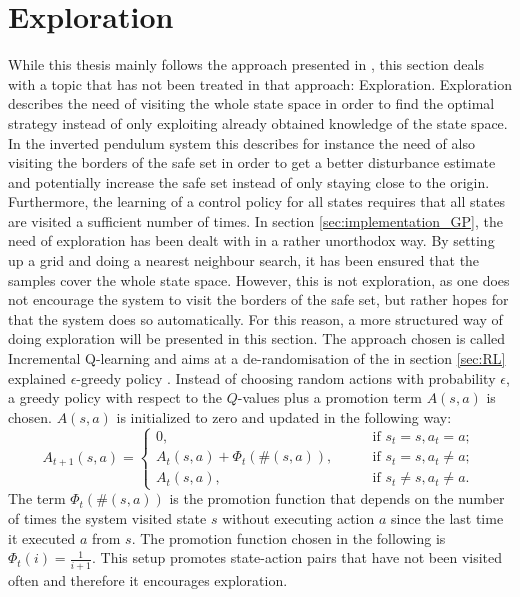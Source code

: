 \documentclass[../main.tex]{subfiles}
\begin{document}
\section{Exploration} \label{sec:Exploration}
While this thesis mainly follows the approach presented in \cite{akametalu2014reachability}, this section deals with a topic that has not been treated in that approach: Exploration. Exploration describes the need of visiting the whole state space in order to find the optimal strategy instead of only exploiting already obtained knowledge of the state space. In the inverted pendulum system this describes for instance the need of also visiting the borders of the safe set in order to get a better disturbance estimate and potentially increase the safe set instead of only staying close to the origin. Furthermore, the learning of a control policy for all states requires that all states are visited a sufficient number of times. In section \ref{sec:implementation_GP}, the need of exploration has been dealt with in a rather unorthodox way. By setting up a grid and doing a nearest neighbour search, it has been ensured that the samples cover the whole state space. However, this is not exploration, as one does not encourage the system to visit the borders of the safe set, but rather hopes for that the system does so automatically. For this reason, a more structured way of doing exploration will be presented in this section. The approach chosen is called Incremental Q-learning and aims at a de-randomisation of the in section \ref{sec:RL} explained $\epsilon$-greedy policy \cite{even2001convergence}. Instead of choosing random actions with probability $\epsilon$, a greedy policy with respect to the $Q$-values plus a promotion term $A(s,a)$ is chosen. $A(s,a)$ is initialized to zero and updated in the following way:
\begin{equation}
    A_{t+1}(s,a) = 
\begin{cases}
    0,\qquad &\text{if } s_t = s, a_t = a;\\    
    A_{t}(s,a) + \Phi_t(\#(s,a)),\qquad &\text{if } s_t = s, a_t \neq a;\\
    A_{t}(s,a),\qquad &\text{if } s_t \neq s, a_t \neq a.
\end{cases}
\end{equation}
The term $\Phi_t(\#(s,a))$ is the promotion function that depends on the number of times the system visited state $s$ without executing action $a$ since the last time it executed $a$ from $s$. The promotion function chosen in the following is $\Phi_t(i) = \frac{1}{i+1}$. This setup promotes state-action pairs that have not been visited often and therefore it encourages exploration.
\end{document}
